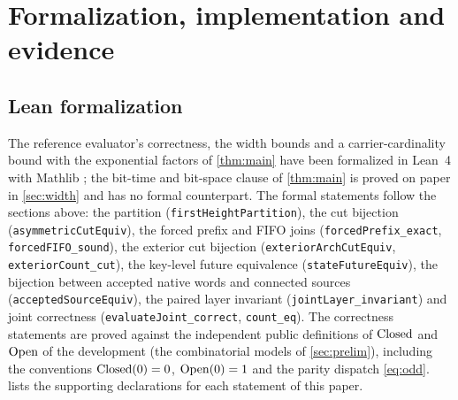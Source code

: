 \section{Formalization, implementation and evidence}
\label{sec:evidence}

\subsection{Lean formalization}

The reference evaluator's correctness, the width bounds and a
carrier-cardinality bound with the exponential factors of \cref{thm:main}
have been formalized in Lean~4 with Mathlib \cite{Moura2021Lean4,mathlib2020};
the bit-time and bit-space clause of \cref{thm:main} is proved on paper in
\cref{sec:width} and has no formal counterpart. The formal statements follow
the sections above:
the partition (\texttt{firstHeightPartition}), the cut bijection
(\texttt{asymmetricCutEquiv}), the forced prefix and FIFO joins
(\texttt{forcedPrefix\_exact}, \texttt{forcedFIFO\_sound}), the exterior cut
bijection (\texttt{exteriorArchCutEquiv}, \texttt{exteriorCount\_cut}), the
key-level future equivalence (\texttt{stateFutureEquiv}), the bijection between
accepted native words and connected sources (\texttt{acceptedSourceEquiv}), the
paired layer invariant (\texttt{jointLayer\_invariant}) and joint correctness
(\texttt{evaluateJoint\_correct}, \texttt{count\_eq}). The correctness statements
are proved against the independent public definitions of $\operatorname{Closed}$ and $\operatorname{Open}$
of the development (the combinatorial models of \cref{sec:prelim}), including
the conventions $\operatorname{Closed}(0)=0$, $\operatorname{Open}(0)=1$ and the parity dispatch
\eqref{eq:odd}.  lists the supporting declarations for each
statement of this paper.

